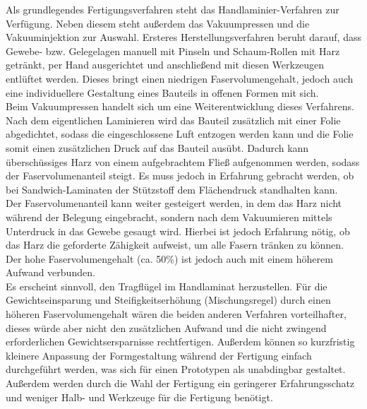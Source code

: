 \noindent Als grundlegendes Fertigungsverfahren steht das Handlaminier-Verfahren zur Verfügung. Neben diesem steht außerdem das Vakuumpressen und die Vakuuminjektion zur Auswahl. Ersteres Herstellungsverfahren beruht darauf, dass Gewebe- bzw. Gelegelagen  manuell mit Pinseln und Schaum-Rollen mit Harz getränkt, per Hand ausgerichtet und anschließend mit diesen Werkzeugen entlüftet werden. Dieses bringt einen niedrigen Faservolumengehalt, jedoch auch eine individuellere Gestaltung eines Bauteils in offenen Formen mit sich. \\
Beim Vakuumpressen handelt sich um eine Weiterentwicklung dieses Verfahrens. Nach dem eigentlichen Laminieren wird das Bauteil zusätzlich mit einer Folie abgedichtet, sodass die eingeschlossene Luft entzogen werden kann und die Folie somit einen zusätzlichen Druck auf das Bauteil ausübt. Dadurch kann überschüssiges Harz von einem aufgebrachtem Fließ aufgenommen werden, sodass der Faservolumenanteil steigt. Es muss jedoch in Erfahrung gebracht werden, ob bei Sandwich-Laminaten der Stützstoff dem Flächendruck standhalten kann.\\
Der Faservolumenanteil kann weiter gesteigert werden, in dem das Harz nicht während der Belegung eingebracht, sondern nach dem Vakuumieren mittels Unterdruck in das Gewebe gesaugt wird. Hierbei ist jedoch Erfahrung nötig, ob das Harz die geforderte Zähigkeit aufweist, um alle Fasern tränken zu können. Der hohe Faservolumengehalt (ca. 50\%) ist jedoch auch mit einem höherem Aufwand verbunden.\\

\noindent Es erscheint sinnvoll, den Tragflügel im Handlaminat herzustellen. Für die Gewichtseinsparung und Steifigkeitserhöhung (Mischungsregel) durch einen höheren Faservolumengehalt wären die beiden anderen Verfahren vorteilhafter, dieses würde aber nicht den zusätzlichen Aufwand und die nicht zwingend erforderlichen Gewichtsersparnisse rechtfertigen. Außerdem können so kurzfristig kleinere Anpassung der Formgestaltung während der Fertigung einfach durchgeführt werden, was sich für einen Prototypen als unabdingbar gestaltet. Außerdem werden durch die Wahl der Fertigung ein geringerer Erfahrungsschatz und weniger Halb- und Werkzeuge für die Fertigung benötigt.